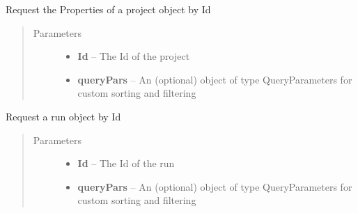 \documentclass[letterpaper,10pt,english]{sphinxmanual}
\begin{document}
\begin{fulllineitems}
\begin{fulllineitems}
\end{fulllineitems}


\begin{fulllineitems}
\label{Available modules:BaseSpacePy.api.BaseSpaceAPI.BaseSpaceAPI.getProjectPropertiesById}
Request the Properties of a project object by Id
\begin{quote}\begin{description}
\item[{Parameters}] \leavevmode\begin{itemize}
\item {} 
\textbf{Id} -- The Id of the project

\item {} 
\textbf{queryPars} -- An (optional) object of type QueryParameters for custom sorting and filtering

\end{itemize}

\end{description}\end{quote}

\end{fulllineitems}


\begin{fulllineitems}
\label{Available modules:BaseSpacePy.api.BaseSpaceAPI.BaseSpaceAPI.getRunById}
Request a run object by Id
\begin{quote}\begin{description}
\item[{Parameters}] \leavevmode\begin{itemize}
\item {} 
\textbf{Id} -- The Id of the run

\item {} 
\textbf{queryPars} -- An (optional) object of type QueryParameters for custom sorting and filtering

\end{itemize}

\end{description}\end{quote}


\end{fulllineitems}
\end{fulllineitems}
\end{document}
